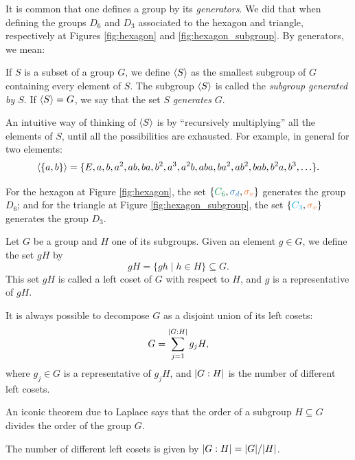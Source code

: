 It is common that one defines a group by its \textit{generators}. We did that when defining the groups $D_6$ and $D_3$ associated to the hexagon and triangle, respectively at Figures \ref{fig:hexagon} and \ref{fig:hexagon_subgroup}. By generators, we mean:

\begin{definition}
If $S$ is a subset of a group $G$, we define $\ev{S}$ as the smallest subgroup of $G$ containing every element of $S$. The subgroup $\ev{S}$ is called the \textit{subgroup generated by $S$}. If $\ev{S} = G$, we say that the set $S$ \textit{generates} $G$.

An intuitive way of thinking of $\ev{S}$ is by ``recursively multiplying'' all the elements of $S$, until all the possibilities are exhausted. For example, in general for two elements:
$$
\ev{\{a,b\}} = \{E, a, b, a^2, ab, ba, b^2, a^3, a^2b, aba, ba^2, ab^2, bab, b^2a, b^3, \ldots\}.
$$
\end{definition}

For the hexagon at Figure \ref{fig:hexagon}, the set $\{\textcolor{ForestGreen}{C_6}, \textcolor{RoyalBlue}{\sigma_d}, \textcolor{Orange}{\sigma_v}\}$ generates the group $D_6$; and for the triangle at Figure \ref{fig:hexagon_subgroup}, the set $\{\textcolor{Cyan}{C_3}, \textcolor{Orange}{\sigma_v}\}$ generates the group $D_3$.

\begin{definition}
Let $G$ be a group and $H$ one of its subgroups. Given an element $g \in G$, we define the set $gH$ by
$$
gH = \{g h \mid h \in H\} \subseteq G.
$$
This set $gH$ is called a left coset of $G$ with respect to $H$, and $g$ is a representative of $gH$.

It is always possible to decompose $G$ as a disjoint union of its left cosets:
$$
G = \sum_{j=1}^{\abs{G:H}} g_j H,
$$
where $g_j \in G$ is a representative of $g_j H$, and $\abs{G:H}$ is the number of different left cosets.
\end{definition}

An iconic theorem due to Laplace says that the order of a subgroup $H \subseteq G$ divides the order of the group $G$.

\begin{theorem}
The number of different left cosets is given by $\abs{G:H} = \abs{G} / \abs{H}$.
\end{theorem}

